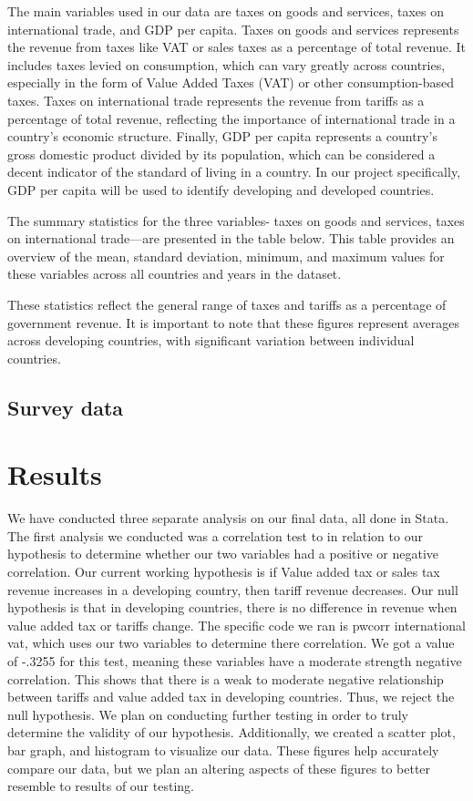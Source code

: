 \documentclass[12pt]{article}
\begin{document}
The main variables used in our data are taxes on goods and services, taxes on international trade, and GDP per capita. Taxes on goods and services represents the revenue from taxes like VAT or sales taxes as a percentage of total revenue. It includes taxes levied on consumption, which can vary greatly across countries, especially in the form of Value Added Taxes (VAT) or other consumption-based taxes. Taxes on international trade represents the revenue from tariffs as a percentage of total revenue, reflecting the importance of international trade in a country's economic structure. Finally, GDP per capita represents a country's gross domestic product divided by its population, which can be considered a decent indicator of the standard of living in a country. In our project specifically, GDP per capita will be used to identify developing and developed countries. 

The summary statistics for the three variables- taxes on goods and services, taxes on international trade—are presented in the table below. This table provides an overview of the mean, standard deviation, minimum, and maximum values for these variables across all countries and years in the dataset.



These statistics reflect the general range of taxes and tariffs as a percentage of government revenue. It is important to note that these figures represent averages across developing countries, with significant variation between individual countries.




\subsection{Survey data}

\section{Results}
\label{sec:result}

We have conducted three separate analysis on our final data, all done in Stata. The first analysis we conducted was a correlation test to in relation to our hypothesis to determine whether our two variables had a positive or negative correlation. Our current working hypothesis is if Value added tax or sales tax revenue increases in a developing country, then tariff revenue decreases. Our null hypothesis is that in developing countries, there is no difference in revenue when value added tax or tariffs change. The specific code we ran is pwcorr international vat, which uses our two variables to determine there correlation. We got a value of -.3255 for this test, meaning these variables have a moderate strength negative correlation. This shows that there is a weak to moderate negative relationship between tariffs and value added tax in developing countries. Thus, we reject the null hypothesis. We plan on conducting further testing in order to truly determine the validity of our hypothesis. Additionally, we created a scatter plot, bar graph, and histogram to visualize our data. These figures help accurately compare our data, but we plan an altering aspects of these figures to better resemble to results of our testing. 
\end{document}

